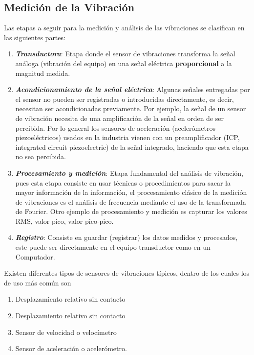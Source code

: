 		\subsection{Medición de la Vibración} 
			Las etapas a seguir para la medición y análisis de las vibraciones se clasifican en las siguientes partes:
			\begin{enumerate}
				\item \textbf{\textit{Transductora}}: Etapa donde el sensor de vibraciones transforma la señal análoga (vibración del equipo) en una señal eléctrica \textbf{proporcional} a la magnitud medida.
					
				\item \textbf{\textit{Acondicionamiento de la señal eléctrica}}: Algunas señales entregadas por el sensor no pueden ser registradas o introducidas directamente, es decir, necesitan ser acondicionadas previamente. Por ejemplo, la señal de un sensor de vibración necesita de una amplificación de la señal en orden de ser percibida. Por lo general los sensores de aceleración (acelerómetros piezoeléctricos) usados en la industria vienen con un preamplificador (ICP, integrated circuit piezoelectric) de la señal integrado, haciendo que esta etapa no sea percibida.
					
				\item \textbf{\textit{Procesamiento  y medición}}: Etapa fundamental del análisis de vibración, pues esta etapa consiste en usar técnicas o procedimientos para sacar la mayor información de la información, el procesamiento clásico de la medición de vibraciones es el análisis de frecuencia mediante el uso de la transformada de Fourier. Otro ejemplo de procesamiento y medición es capturar los valores RMS, valor pico, valor pico-pico.
					
				\item \textbf{\textit{Registro}}: Consiste en guardar (registrar) los datos medidos y procesados, este puede ser directamente en el equipo transductor como en un Computador.
			\end{enumerate} 
			Existen diferentes tipos de sensores de vibraciones típicos, dentro de los cuales los de uso más común son
			\begin{enumerate}
				\item Desplazamiento relativo sin contacto
				\item Desplazamiento relativo sin contacto
				\item Sensor de velocidad o velocímetro
				\item Sensor de aceleración o acelerómetro.
			\end{enumerate}
